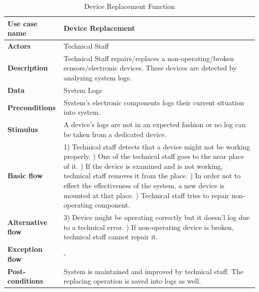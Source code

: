  \begin{table}[H]
     \centering
     \begin{tabular}{ | l | p{10cm} |}
     \hline
     \textbf{Use case name}    & Device Replacement \\
     \hline
     \textbf{Actors}           & Technical Staff \\
     \hline
     \textbf{Description}      & Technical Staff repairs/replaces a non-operating/broken sensors/electronic devices. These devices are detected by analyzing system logs.\\
     \hline
     \textbf{Data}             & System Logs \\
     \hline
     \textbf{Preconditions}    & System's electronic components logs their current situation into system. \\
     \hline
     \textbf{Stimulus}         & A device's logs are not in an expected fashion or no log can be taken from a dedicated device. \\
     \hline
     \textbf{Basic flow}       & 1) Technical staff detects that a device might not be working properly. \newline 2) One of the technical staff goes to the near place of it.  \newline 3) If the device is examined and is not working, technical staff removes it from the place. \newline 4) In order not to effect the effectiveness of the system, a new device is mounted at that place. \newline 5) Technical staff tries to repair non-operating component.\\
     \hline
     \textbf{Alternative flow} & 3) Device might be operating correctly but it doesn'l log due to a technical error. \newline 5) If non-operating device is broken, technical staff cannot repair it.  \\
     \hline
     \textbf{Exception flow}   & -\\
     \hline
     \textbf{Post-conditions}  & System is maintained and improved by technical staff. The replacing operation is saved into logs as well. \\
     \hline
     \end{tabular} \caption{Device Replacement Function}
     \label{tab:10device_replacement}
 \end{table}



